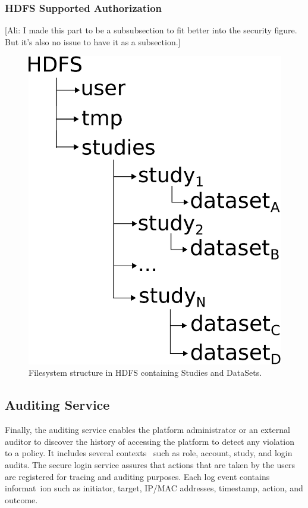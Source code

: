 \subsubsection{HDFS Supported Authorization}
[Ali: I made this part to be a subsubsection to fit better into the security figure. But it's also no issue to have it as a subsection.]

\begin{figure}[h]
 \centering
 \includegraphics[scale=0.2]{./imgs/HDFS-structure.eps}
 \caption{Filesystem structure in HDFS containing Studies and DataSets.}
\end{figure}


\subsection {Auditing Service}
Finally, the auditing service enables the platform administrator or an external auditor to discover the history of accessing the platform to detect any violation to a policy. It includes several contexts \
such as role, account, study, and login audits. The secure login service assures that actions that are taken by the users are registered for tracing and auditing purposes. Each log event contains informat\
ion such as initiator, target, IP/MAC addresses, timestamp, action, and outcome.
